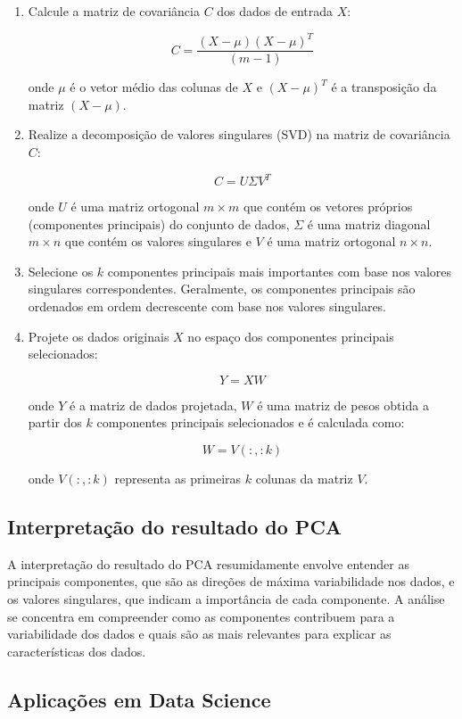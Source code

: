 \documentclass[12pt, a4paper]{article}
\begin{document}
\begin{enumerate}
  \item Calcule a matriz de covariância $C$ dos dados de entrada $X$:

  \[
  C = \frac{(X - \mu)(X - \mu)^T}{(m - 1)}
  \]

  onde $\mu$ é o vetor médio das colunas de $X$ e $(X - \mu)^T$ é a transposição da matriz $(X - \mu)$.

  \item Realize a decomposição de valores singulares (SVD) na matriz de covariância $C$:

  \[
  C = U \Sigma V^T
  \]

  onde $U$ é uma matriz ortogonal $m \times m$ que contém os vetores próprios (componentes principais) do conjunto de dados, $\Sigma$ é uma matriz diagonal $m \times n$ que contém os valores singulares e $V$ é uma matriz ortogonal $n \times n$.

  \item Selecione os $k$ componentes principais mais importantes com base nos valores singulares correspondentes. Geralmente, os componentes principais são ordenados em ordem decrescente com base nos valores singulares.

  \item Projete os dados originais $X$ no espaço dos componentes principais selecionados:

  \[
  Y = XW
  \]

  onde $Y$ é a matriz de dados projetada, $W$ é uma matriz de pesos obtida a partir dos $k$ componentes principais selecionados e é calculada como:

  \[
  W = V(:, :k)
  \]

  onde $V(:, :k)$ representa as primeiras $k$ colunas da matriz $V$.
\end{enumerate}
\subsection{Interpretação do resultado do PCA}
A interpretação do resultado do PCA resumidamente envolve entender as principais componentes, que são as direções de máxima variabilidade nos dados, e os valores singulares, que indicam a importância de cada componente. A análise se concentra em compreender como as componentes contribuem para a variabilidade dos dados e quais são as mais relevantes para explicar as características dos dados.

\subsection{Aplicações em Data Science}
\end{document}
